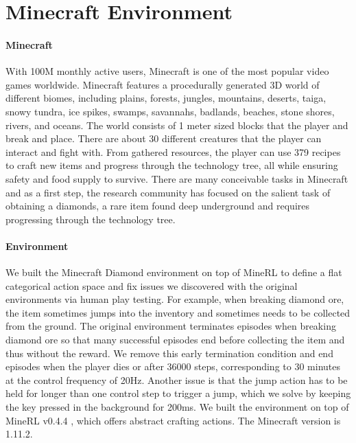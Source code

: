 
\section{Minecraft Environment}
\label{sec:mcenv}

\paragraph{Minecraft}
With 100M monthly active users, Minecraft is one of the most popular video games worldwide.
Minecraft features a procedurally generated 3D world of different biomes, including plains, forests, jungles, mountains, deserts, taiga, snowy tundra, ice spikes, swamps, savannahs, badlands, beaches, stone shores, rivers, and oceans.
The world consists of 1 meter sized blocks that the player and break and place.
There are about 30 different creatures that the player can interact and fight with.
From gathered resources, the player can use 379 recipes to craft new items and progress through the technology tree, all while ensuring safety and food supply to survive.
There are many conceivable tasks in Minecraft and as a first step, the research community has focused on the salient task of obtaining a diamonds, a rare item found deep underground and requires progressing through the technology tree.

\paragraph{Environment}
We built the Minecraft Diamond environment on top of MineRL to define a flat categorical action space and fix issues we discovered with the original environments via human play testing.
For example, when breaking diamond ore, the item sometimes jumps into the inventory and sometimes needs to be collected from the ground.
The original environment terminates episodes when breaking diamond ore so that many successful episodes end before collecting the item and thus without the reward.
We remove this early termination condition and end episodes when the player dies or after 36000 steps, corresponding to 30 minutes at the control frequency of 20Hz.
Another issue is that the jump action has to be held for longer than one control step to trigger a jump, which we solve by keeping the key pressed in the background for 200ms.
We built the environment on top of MineRL v0.4.4 \citep{guss2019minerl}, which offers abstract crafting actions. The Minecraft version is 1.11.2.

